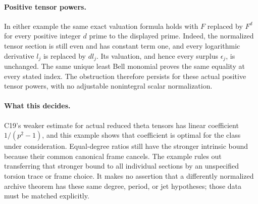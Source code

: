 \paragraph{Positive tensor powers.}
In either example the same exact valuation formula holds
with $F$ replaced by $F^d$ for every positive integer $d$
prime to the displayed prime.  Indeed, the normalized
tensor section is still even and has constant term one,
and every logarithmic derivative $l_j$ is replaced by
$d l_j$.  Its valuation, and hence every surplus
$\epsilon_j$, is unchanged.  The same unique least
Bell monomial proves the same equality at every stated
index.  The obstruction therefore persists for these
actual positive tensor powers, with no adjustable
nonintegral scalar normalization.

\paragraph{What this decides.}
C19's weaker estimate for actual reduced theta tensors has
linear coefficient $1/(p^2-1)$, and this example shows that
coefficient is optimal for the class under consideration.
Equal-degree ratios still have the stronger intrinsic bound
because their common canonical frame cancels.
The example rules out transferring that stronger bound to
all individual sections by an unspecified torsion trace or
frame choice.  It makes no assertion that a differently
normalized archive theorem has these same degree, period,
or jet hypotheses; those data must be matched explicitly.
